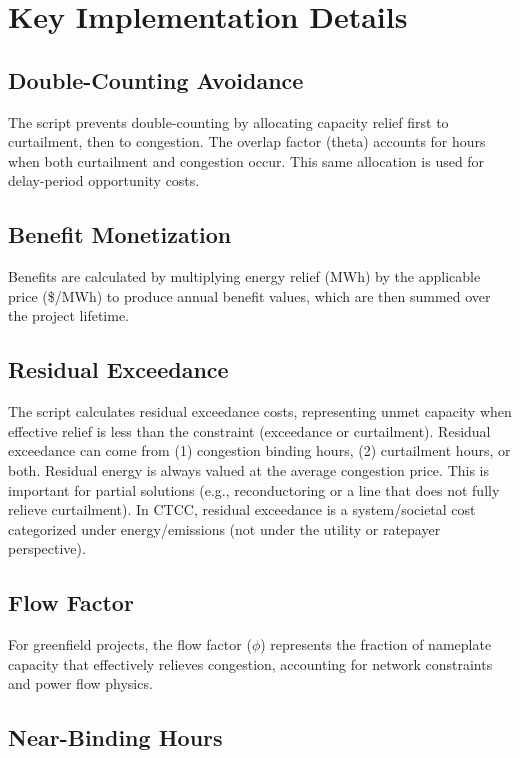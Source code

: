 \documentclass[ctcc_full_documentation.tex]{subfiles}
\begin{document}
\section{Key Implementation Details}

\subsection{Double-Counting Avoidance}

The script prevents double-counting by allocating capacity relief first to curtailment, then to congestion. The overlap factor (theta) accounts for hours when both curtailment and congestion occur. This same allocation is used for delay-period opportunity costs.

\subsection{Benefit Monetization}

Benefits are calculated by multiplying energy relief (MWh) by the applicable price (\$/MWh) to produce annual benefit values, which are then summed over the project lifetime.

\subsection{Residual Exceedance}

The script calculates residual exceedance costs, representing unmet capacity when effective relief is less than the constraint (exceedance or curtailment). Residual exceedance can come from (1) congestion binding hours, (2) curtailment hours, or both. Residual energy is always valued at the average congestion price. This is important for partial solutions (e.g., reconductoring or a line that does not fully relieve curtailment). In CTCC, residual exceedance is a system/societal cost categorized under energy/emissions (not under the utility or ratepayer perspective).

\subsection{Flow Factor}

For greenfield projects, the flow factor ($\phi$) represents the fraction of nameplate capacity that effectively relieves congestion, accounting for network constraints and power flow physics.

\subsection{Near-Binding Hours}
\end{document}
